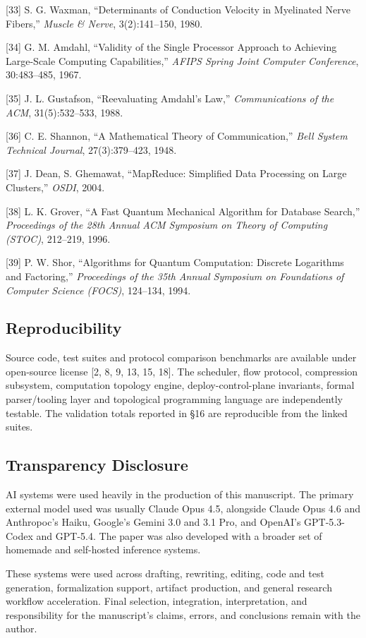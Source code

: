 \documentclass[
  11pt,
]{article}
\begin{document}
{[}33{]} S. G. Waxman, ``Determinants of Conduction Velocity in
Myelinated Nerve Fibers,'' \emph{Muscle \& Nerve}, 3(2):141--150, 1980.

{[}34{]} G. M. Amdahl, ``Validity of the Single Processor Approach to
Achieving Large-Scale Computing Capabilities,'' \emph{AFIPS Spring Joint
Computer Conference}, 30:483--485, 1967.

{[}35{]} J. L. Gustafson, ``Reevaluating Amdahl's Law,''
\emph{Communications of the ACM}, 31(5):532--533, 1988.

{[}36{]} C. E. Shannon, ``A Mathematical Theory of Communication,''
\emph{Bell System Technical Journal}, 27(3):379--423, 1948.

{[}37{]} J. Dean, S. Ghemawat, ``MapReduce: Simplified Data Processing
on Large Clusters,'' \emph{OSDI}, 2004.

{[}38{]} L. K. Grover, ``A Fast Quantum Mechanical Algorithm for
Database Search,'' \emph{Proceedings of the 28th Annual ACM Symposium on
Theory of Computing (STOC)}, 212--219, 1996.

{[}39{]} P. W. Shor, ``Algorithms for Quantum Computation: Discrete
Logarithms and Factoring,'' \emph{Proceedings of the 35th Annual
Symposium on Foundations of Computer Science (FOCS)}, 124--134, 1994.

\subsection{Reproducibility}\label{reproducibility}

Source code, test suites and protocol comparison benchmarks are
available under open-source license {[}2, 8, 9, 13, 15, 18{]}. The
scheduler, flow protocol, compression subsystem, computation topology
engine, deploy-control-plane invariants, formal parser/tooling layer and
topological programming language are independently testable. The
validation totals reported in §16 are reproducible from the linked
suites.

\subsection{Transparency Disclosure}\label{transparency-disclosure}

AI systems were used heavily in the production of this manuscript. The
primary external model used was usually Claude Opus 4.5, alongside
Claude Opus 4.6 and Anthropoc's Haiku, Google's Gemini 3.0 and 3.1 Pro,
and OpenAI's GPT-5.3-Codex and GPT-5.4. The paper was also developed
with a broader set of homemade and self-hosted inference systems.

These systems were used across drafting, rewriting, editing, code and
test generation, formalization support, artifact production, and general
research workflow acceleration. Final selection, integration,
interpretation, and responsibility for the manuscript's claims, errors,
and conclusions remain with the author.
\end{document}
